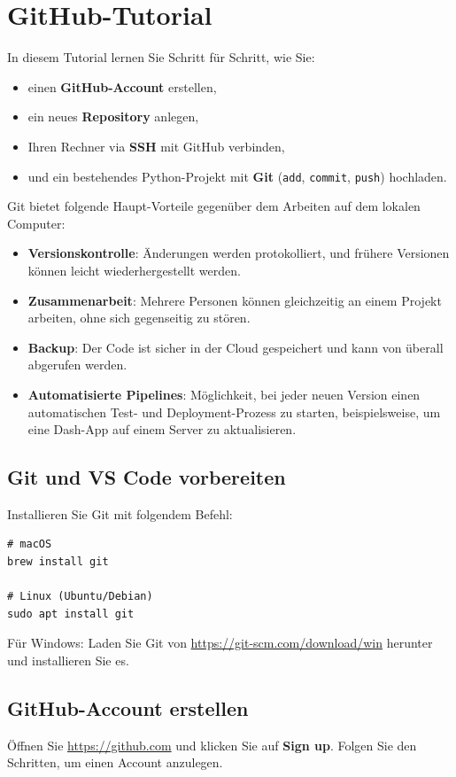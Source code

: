 \section*{GitHub-Tutorial}
\label{ch:GitHub}

In diesem Tutorial lernen Sie Schritt für Schritt, wie Sie:
\begin{itemize}
  \item einen \textbf{GitHub-Account} erstellen,
  \item ein neues \textbf{Repository} anlegen,
  \item Ihren Rechner via \textbf{SSH} mit GitHub verbinden,
  \item und ein bestehendes Python-Projekt mit \textbf{Git} (\lstinline|add|, \lstinline|commit|, \lstinline|push|) hochladen.
\end{itemize}

Git bietet folgende Haupt-Vorteile gegenüber dem Arbeiten auf dem lokalen Computer:
\begin{itemize}
  \item \textbf{Versionskontrolle}: Änderungen werden protokolliert, und frühere Versionen können leicht wiederhergestellt werden.
  \item \textbf{Zusammenarbeit}: Mehrere Personen können gleichzeitig an einem Projekt arbeiten, ohne sich gegenseitig zu stören.
  \item \textbf{Backup}: Der Code ist sicher in der Cloud gespeichert und kann von überall abgerufen werden.
  \item \textbf{Automatisierte Pipelines}: Möglichkeit, bei jeder neuen Version einen automatischen Test- und Deployment-Prozess zu starten, beispielsweise, um eine Dash-App auf einem Server zu aktualisieren.
\end{itemize}

\subsection*{Git und VS Code vorbereiten}
Installieren Sie Git mit folgendem Befehl:  

\begin{lstlisting}[style=bash]
# macOS
brew install git

# Linux (Ubuntu/Debian)
sudo apt install git
\end{lstlisting}

Für Windows: Laden Sie Git von \url{https://git-scm.com/download/win} herunter und installieren Sie es.

\subsection*{GitHub-Account erstellen}
Öffnen Sie \url{https://github.com} und klicken Sie auf \textbf{Sign up}. Folgen Sie den Schritten, um einen Account anzulegen.  

